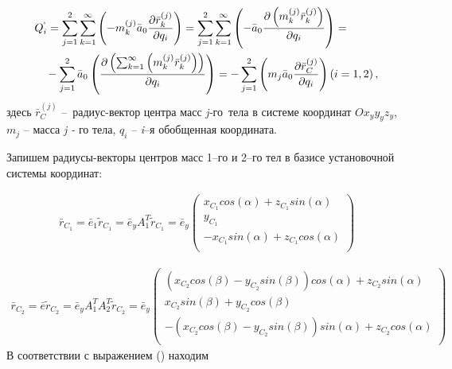\begin{equation} %
\label{eq:p3:29}
\begin{multlined}
Q_{i}^{`}= 
\sum _{j=1}^{2} \sum _{k=1}^{\infty} \left( -m_{k}^{ \left( j \right) }\bar{a}_{0} \frac{ \partial \bar{r}_{k}^{ \left( j \right) }}{ \partial q_{i}} \right) = 
\sum _{j=1}^{2} \sum _{k=1}^{\infty} \left( -\bar{a}_{0} \frac{ \partial \left( m_{k}^{ \left( j \right) }\bar{r}_{k}^{ \left( j \right) } \right) }{ \partial q_{i}} \right) = \\
- \sum _{j=1}^{2}\bar{a}_{0} \left( \frac{ \partial \left( \sum _{k=1}^{\infty} \left( m_{k}^{ \left( j \right) }\bar{r}_{k}^{ \left( j \right) } \right) \right) }{ \partial q_{i}} \right) =
- \sum _{j=1}^{2} \left( m_{j}\bar{a}_{0} \frac{ \partial \bar{r}_{C}^{ \left( j \right) }}{ \partial q_{i}} \right) \left( i=1,2 \right),
\end{multlined}
\end{equation}
здесь \( \bar{r}_{C}^{ \left( j \right) } \) –\ радиус-вектор центра масс \textit{j-}го\ тела в системе координат \( Ox_{y}y_{y}z_{y} \), \( m_{j} \) – масса \textit{j - }го тела, \( q_{i} \) – \textit{i}–я обобщенная координата. 

Запишем радиусы-векторы центров масс 1–го и 2–го тел в базисе установочной системы координат: 


\begin{equation} %
\label{eq:p3:30}
\begin{multlined}
\bar{r}_{C_{1}}=\bar{e}_{1}\tilde{r}_{C_{1}}=\bar{e}_{y}A_{1}^{T}\tilde{r}_{C_{1}}=\bar{e}_{y} \left( \begin{matrix}
x_{C_{1}}cos \left( \alpha \right) +z_{C_{1}}sin \left( \alpha \right) \\
y_{C_{1}}\\
-x_{C_{1}}sin \left( \alpha \right) +z_{C_{1}}cos \left( \alpha \right) \\
\end{matrix}
\right) 
\end{multlined}
\end{equation}

\begin{equation} %
\label{eq:p3:31}
\begin{multlined}
\bar{r}_{C_{2}}=\bar{e}\tilde{r}_{C_{2}}=\bar{e}_{y}A_{1}^{T}A_{2}^{T}\tilde{r}_{C_{2}}=\bar{e}_{y} \left( \begin{matrix}
\left( x_{C_{2}}cos \left( \beta \right) -y_{C_{2}}sin \left( \beta \right) \right) cos \left( \alpha \right) +z_{C_{2}}sin \left( \alpha \right) \\
x_{C_{2}}sin \left( \beta \right) +y_{C_{2}}cos \left( \beta \right) \\
- \left( x_{C_{2}}cos \left( \beta \right) -y_{C_{2}}sin \left( \beta \right) \right) sin \left( \alpha \right) +z_{C_{2}}cos \left( \alpha \right) \\
\end{matrix}
\right) 
\end{multlined}
\end{equation}
В соответствии с выражением () находим


